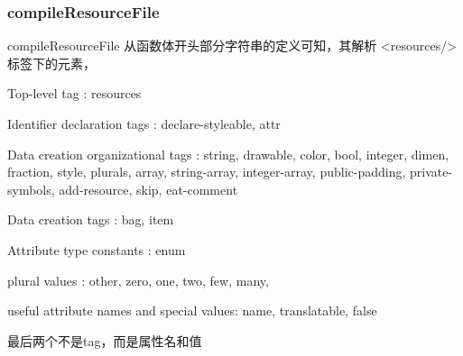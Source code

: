 \documentclass[a4paper,11pt]{article}
\begin{document}
\subsubsection{compileResourceFile}\label{compileresfile}
compileResourceFile  从函数体开头部分字符串的定义可知，其解析 <resources/> 标签下的元素，
\begin{itemize*}
    \item Top-level tag :                     resources 
    \item Identifier declaration tags :       declare-styleable, attr
    \item Data creation organizational tags : string, drawable, color, bool,
        integer, dimen, fraction, style, plurals, array, string-array,
        integer-array, public-padding, private-symbols, add-resource, skip,
        eat-comment
    \item Data creation tags :       bag, item
    \item Attribute type constants : enum 
    \item plural values :            other, zero, one, two, few, many, 
    \item useful attribute names and special values:  name, translatable, false
\end{itemize*}
最后两个不是tag，而是属性名和值
\end{document}
